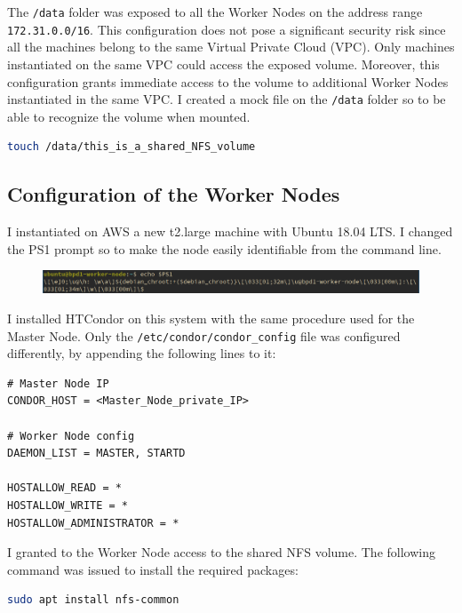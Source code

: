 \documentclass{article}
\begin{document}
The \texttt{/data} folder was exposed to all the Worker Nodes on the address range \texttt{172.31.0.0/16}.
This configuration does not pose a significant security risk since all the machines belong to the same Virtual Private Cloud (VPC). Only machines instantiated on the same VPC could access the exposed volume.
Moreover, this configuration grants immediate access to the volume to additional Worker Nodes instantiated in the same VPC\@.
I created a mock file on the \texttt{/data} folder so to be able to recognize the volume when mounted.

\begin{lstlisting}[language=bash]
touch /data/this_is_a_shared_NFS_volume
\end{lstlisting}

\subsection{Configuration of the Worker Nodes}
I instantiated on AWS a new t2.large machine with Ubuntu 18.04 LTS\@.
I changed the PS1 prompt so to make the node easily identifiable from the command line.

\begin{figure}[!h]
    \center%
    \includegraphics[width=\textwidth]{./images/worker-ps1.png}
\end{figure}

I installed HTCondor on this system with the same procedure used for the Master Node.
Only the \texttt{/etc/condor/condor\_config} file was configured differently, by appending the following lines to it:

\begin{lstlisting}
# Master Node IP
CONDOR_HOST = <Master_Node_private_IP>

# Worker Node config
DAEMON_LIST = MASTER, STARTD

HOSTALLOW_READ = *
HOSTALLOW_WRITE = *
HOSTALLOW_ADMINISTRATOR = *
\end{lstlisting}

I granted to the Worker Node access to the shared NFS volume.
The following command was issued to install the required packages:

\begin{lstlisting}[language=bash]
sudo apt install nfs-common
\end{lstlisting}
\end{document}
